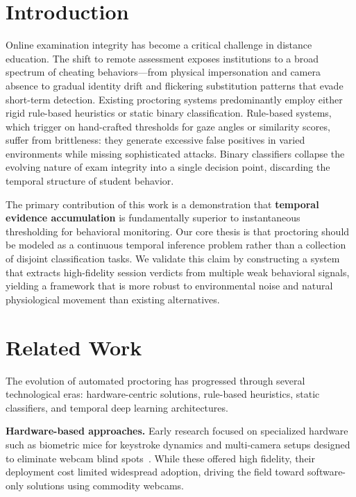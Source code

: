 \documentclass[conference]{IEEEtran}
\begin{document}
\section{Introduction}

Online examination integrity has become a critical challenge in distance education. The shift to remote assessment exposes institutions to a broad spectrum of cheating behaviors---from physical impersonation and camera absence to gradual identity drift and flickering substitution patterns that evade short-term detection. Existing proctoring systems predominantly employ either rigid rule-based heuristics or static binary classification. Rule-based systems, which trigger on hand-crafted thresholds for gaze angles or similarity scores, suffer from brittleness: they generate excessive false positives in varied environments while missing sophisticated attacks. Binary classifiers collapse the evolving nature of exam integrity into a single decision point, discarding the temporal structure of student behavior.

The primary contribution of this work is a demonstration that \textbf{temporal evidence accumulation} is fundamentally superior to instantaneous thresholding for behavioral monitoring. Our core thesis is that proctoring should be modeled as a continuous temporal inference problem rather than a collection of disjoint classification tasks. We validate this claim by constructing a system that extracts high-fidelity session verdicts from multiple weak behavioral signals, yielding a framework that is more robust to environmental noise and natural physiological movement than existing alternatives.

\section{Related Work}

The evolution of automated proctoring has progressed through several technological eras: hardware-centric solutions, rule-based heuristics, static classifiers, and temporal deep learning architectures.

\textbf{Hardware-based approaches.}
Early research focused on specialized hardware such as biometric mice for keystroke dynamics and multi-camera setups designed to eliminate webcam blind spots~\cite{Atoum2017, Traore2011}. While these offered high fidelity, their deployment cost limited widespread adoption, driving the field toward software-only solutions using commodity webcams.
\end{document}
